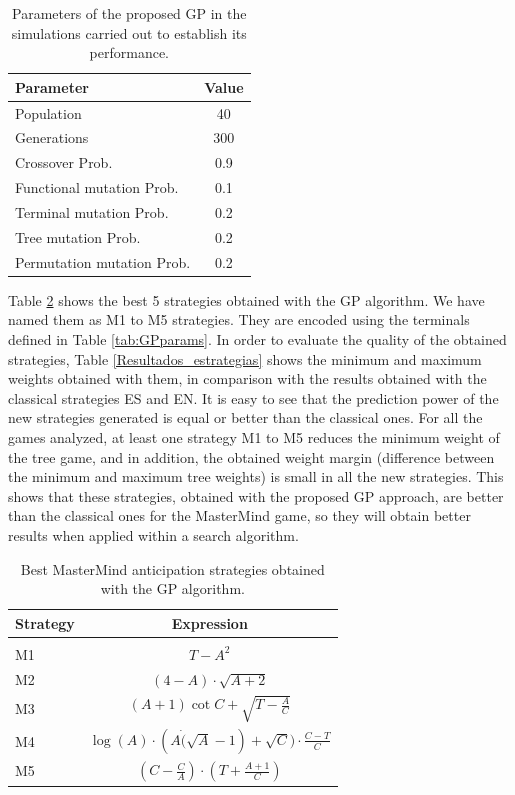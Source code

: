 \begin{table}[!ht]
\centering
\caption{Parameters of the proposed GP in the simulations carried out to establish its performance. \label{tab:paramsGP}}
\begin{tabular}{lc}
\hline
Parameter & Value \\
\hline
Population & 40\\
Generations & 300\\
Crossover Prob.  & 0.9 \\
Functional mutation Prob. & 0.1 \\
Terminal mutation Prob. & 0.2\\
Tree mutation Prob. & 0.2\\
Permutation mutation Prob. & 0.2\\
\hline
\end{tabular}
\end{table}

Table \ref{Nuevas_estrategias} shows the best 5 strategies obtained
with the GP algorithm. We have named them as M1 to M5 strategies. They
are encoded using the terminals defined in Table
\ref{tab:GPparams}. In order to evaluate the quality of the obtained
strategies, Table \ref{Resultados_estrategias} shows the minimum and
maximum weights obtained with them, in comparison with the results
obtained with the classical strategies ES and EN. It is easy to see
that the prediction power of the new strategies generated is equal or
better than the classical ones. For all the games analyzed, at least
one strategy M1 to M5 reduces the minimum weight of the tree game, and
in addition, the obtained weight margin (difference between the
minimum and maximum tree weights) is small in all the new
strategies. This shows that these strategies, obtained with the
proposed GP approach,  are better than the classical ones for the MasterMind game, so they will obtain better results when applied within a search algorithm.


\begin{table}[!ht]
\centering
\caption{Best MasterMind anticipation strategies obtained with the GP algorithm. \label{Nuevas_estrategias}}
\begin{tabular}{lc}
\hline
Strategy & Expression\\
\hline \\
M1& $T-A^2$\\
M2& $(4-A) \cdot \sqrt{A+2}$\\
M3& $(A+1) \cot C + \sqrt{T-\frac{A}{C}}$\\
M4& $\log(A) \cdot (A \dot (\sqrt{A}-1)+\sqrt{C})\cdot \frac{C-T}{C}$\\
M5& $\left(C-\frac{C}{A}\right) \cdot \left(T+\frac{A+1}{C}\right)$\\
\hline
\end{tabular}
\end{table}


